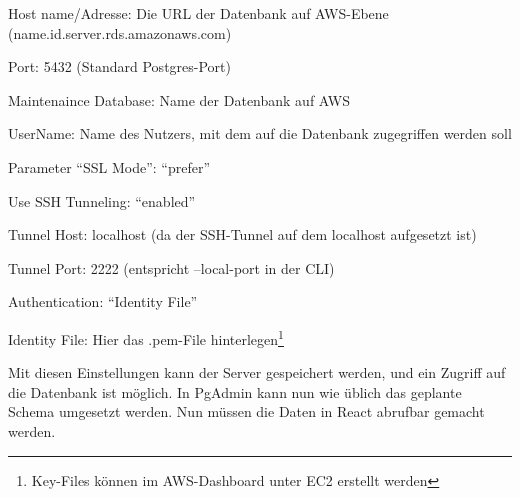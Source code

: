 \begin{compactenum}
	\item Host name/Adresse: Die URL der Datenbank auf AWS-Ebene (name.id.server.rds.amazonaws.com)
	\item Port: 5432 (Standard Postgres-Port)
	\item Maintenaince Database: Name der Datenbank auf AWS
	\item UserName: Name des Nutzers, mit dem auf die Datenbank zugegriffen werden soll
	\item Parameter \enquote{SSL Mode}: \enquote{prefer}
	\item Use SSH Tunneling: \enquote{enabled}
	\item Tunnel Host: localhost (da der SSH-Tunnel auf dem localhost aufgesetzt ist)
	\item Tunnel Port: 2222 (entspricht --local-port in der CLI)
	\item Authentication: \enquote{Identity File}
	\item Identity File: Hier das .pem-File hinterlegen\footnote{Key-Files können im AWS-Dashboard unter EC2 erstellt werden}
\end{compactenum}

Mit diesen Einstellungen kann der Server gespeichert werden, und ein Zugriff auf die Datenbank ist möglich. In PgAdmin kann nun wie üblich das 
geplante Schema umgesetzt werden. Nun müssen die Daten in React abrufbar gemacht werden.


